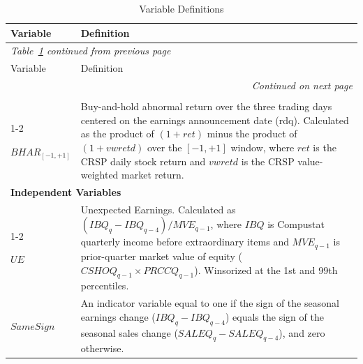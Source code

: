 \documentclass[english,12pt]{article}
\begin{document}
\begingroup
\footnotesize
{}
\renewcommand{\arraystretch}{1.3}
\begin{longtable}{p{3.8cm}p{12cm}}
\caption{Variable Definitions \label{vars}} \\
\toprule
\multicolumn{1}{l}{Variable} & \multicolumn{1}{l}{Definition} \\
\toprule
\endfirsthead

\multicolumn{2}{l}{\textit{Table~\ref{vars} continued from previous page}} \\
\toprule
\multicolumn{1}{l}{Variable} & \multicolumn{1}{l}{Definition} \\
\toprule
\endhead

\midrule
\multicolumn{2}{r}{\textit{Continued on next page}} \\
\endfoot

\bottomrule
\endlastfoot

\multicolumn{2}{l}{\textbf{Dependent Variable}}\\
\cmidrule{1-2}

$BHAR_{[-1,+1]}$ & Buy-and-hold abnormal return over the three trading days centered on the earnings announcement date (rdq). Calculated as the product of $(1 + ret)$ minus the product of $(1 + vwretd)$ over the $[-1,+1]$ window, where $ret$ is the CRSP daily stock return and $vwretd$ is the CRSP value-weighted market return. \\

\multicolumn{2}{l}{\textbf{Independent Variables}}\\
\cmidrule{1-2}

$UE$ & Unexpected Earnings. Calculated as $(IBQ_{q} - IBQ_{q-4}) / MVE_{q-1}$, where $IBQ$ is Compustat quarterly income before extraordinary items and $MVE_{q-1}$ is prior-quarter market value of equity ($CSHOQ_{q-1} \times PRCCQ_{q-1}$). Winsorized at the 1st and 99th percentiles. \\

$SameSign$ & An indicator variable equal to one if the sign of the seasonal earnings change ($IBQ_{q} - IBQ_{q-4}$) equals the sign of the seasonal sales change ($SALEQ_{q} - SALEQ_{q-4}$), and zero otherwise. \\


\end{longtable}
\end{document}

